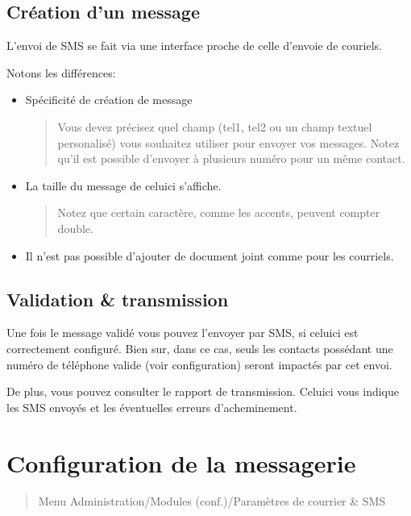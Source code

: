 \documentclass[letterpaper,10pt,french]{sphinxmanual}
\begin{document}
\subsection{Création d’un message}
\label{\detokenize{mailing/sms:creation-d-un-message}}
\sphinxAtStartPar
L’envoi de SMS se fait via une interface proche de celle d’envoie de couriels.

\sphinxAtStartPar
Notons les différences:
\begin{itemize}
\item {} 
\sphinxAtStartPar
Spécificité de création de message
\begin{quote}

\sphinxAtStartPar
Vous devez précisez quel champ (tel1, tel2 ou un champ textuel personalisé) vous souhaitez utiliser pour envoyer vos messages.
Notez qu’il est possible d’envoyer à plusieurs numéro pour un même contact.
\end{quote}

\item {} 
\sphinxAtStartPar
La taille du message de celui\sphinxhyphen{}ci s’affiche.
\begin{quote}

\sphinxAtStartPar
Notez que certain caractère, comme les accents, peuvent compter double.
\end{quote}

\item {} 
\sphinxAtStartPar
Il n’est pas possible d’ajouter de document joint comme pour les courriels.

\end{itemize}


\subsection{Validation \& transmission}
\label{\detokenize{mailing/sms:validation-transmission}}
\sphinxAtStartPar
Une fois le message validé vous pouvez l’envoyer par SMS, si celui\sphinxhyphen{}ci est correctement configuré.
Bien sur, dans ce cas, seuls les contacts possédant une numéro de téléphone valide (voir configuration) seront impactés par cet envoi.

\sphinxAtStartPar
De plus, vous pouvez consulter le rapport de transmission.
Celui\sphinxhyphen{}ci vous indique les SMS envoyés et les éventuelles erreurs d’acheminement.

\sphinxstepscope


\section{Configuration de la messagerie}
\label{\detokenize{mailing/configuration:configuration-de-la-messagerie}}\label{\detokenize{mailing/configuration::doc}}\begin{quote}

\sphinxAtStartPar
Menu Administration/Modules (conf.)/Paramètres de courrier \& SMS
\end{quote}
\end{document}
